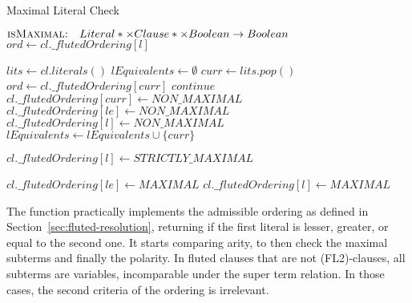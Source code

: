 \begin{algorithm}[ht]
  \caption{Maximal Literal Check}\label{alg:maximal-literal-check}
  \begin{algorithmic}[1]
    \Statex{}  \(\textsc{isMaximal:}\quad Literal* \times Clause* \times Boolean \to Boolean\)
      \State{} \(ord \gets cl.\_flutedOrdering[l]\)
          \State{} 
        \Else{}
          \State{} 
        \EndIf{}
      \EndIf{}

      \State{} \(lits \gets cl.literals()\)
      \State{} \(lEquivalents \gets \emptyset\)
        \State{} \(curr \gets lits.pop()\)
        \State{} \(ord \gets cl.\_flutedOrdering[curr]\)
          \State{} \(continue\)
              \State{} \(cl.\_flutedOrdering[curr] \gets NON\_MAXIMAL\)
            \EndCase{}
                \State{} \(cl.\_flutedOrdering[le] \gets NON\_MAXIMAL\)
              \EndFor{}
              \State{} \(cl.\_flutedOrdering[l] \gets NON\_MAXIMAL\)
              \State{} 
            \EndCase{}
              \State{} \(lEquivalents \gets lEquivalents \cup \{curr\}\)
            \EndCase{}
          \EndSwitch{}
        \EndIf{}
      \EndWhile{}

        \State{} \(cl.\_flutedOrdering[l] \gets STRICTLY\_MAXIMAL\)
        \State{} 
      \EndIf{}

        \State{} \(cl.\_flutedOrdering[le] \gets MAXIMAL\)
      \EndFor{}
      \State{} \(cl.\_flutedOrdering[l] \gets MAXIMAL\)

      \State{} 
    \EndFunction{}
  \end{algorithmic}
\end{algorithm}

The function  practically implements the admissible ordering as defined in Section~\ref{sec:fluted-resolution}, returning if the first literal is lesser, greater, or equal to the second one.
It starts comparing arity, to then check the maximal subterms and finally the polarity. In fluted clauses that are not (FL2)-clauses, all subterms are variables, incomparable under the super term relation.
In those cases, the second criteria of the ordering is irrelevant.

